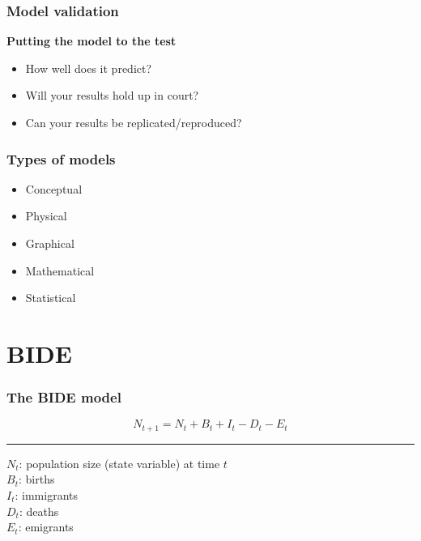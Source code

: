 \documentclass[color=usenames,dvipsnames]{beamer}\usepackage[]{graphicx}\usepackage[]{color}
\begin{document}
\begin{frame}
  \frametitle{Model validation}
  \Large
  {\bf Putting the model to the test}
  \begin{itemize}[<+->]
    \item How well does it predict?
    \item Will your results hold up in court?
    \item Can your results be replicated/reproduced?
  \end{itemize}
\end{frame}












\begin{frame}
  \frametitle{Types of models}
  \LARGE
  \begin{itemize}
    \item { Conceptual}
    \item Physical
    \item Graphical
    \item {\color<2>{Red} Mathematical}
    \item { Statistical}
  \end{itemize}
\end{frame}





\section{BIDE}


\begin{frame}
  \frametitle{The BIDE model}
  \huge
  \[
  N_{t+1} = N_t + B_t + I_t - D_t - E_t
  \]
  \large
  \vfill
  \centering \rule{4cm}{1pt} \flushleft \par
  \vfill
  \Large
  $N_t$: population size (state variable) at time $t$ \\
  $B_t$: births \\
  $I_t$: immigrants \\
  $D_t$: deaths \\
  $E_t$: emigrants
\end{frame}
\end{document}
